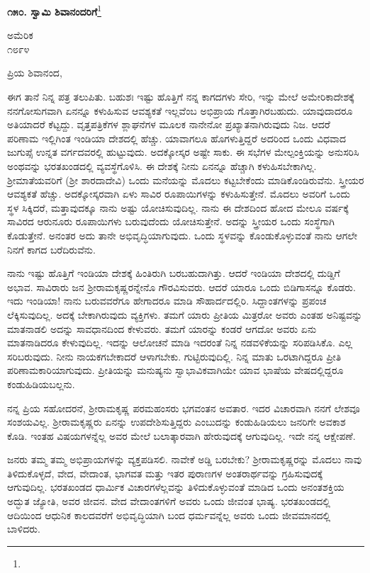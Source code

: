 \begin{center}
\textbf{೧೫೦. ಸ್ವಾಮಿ ಶಿವಾನಂದರಿಗೆ}\footnote{}
\end{center}

\begin{flushright}
ಅಮೆರಿಕ\\೧೮೯೪
\end{flushright}

\noindent
ಪ್ರಿಯ ಶಿವಾನಂದ,

ಈಗ ತಾನೆ ನಿನ್ನ ಪತ್ರ ತಲುಪಿತು. ಬಹುಶಃ ಇಷ್ಟು ಹೊತ್ತಿಗೆ ನನ್ನ ಕಾಗದಗಳು ಸೇರಿ, ಇನ್ನು ಮೇಲೆ ಅಮೇರಿಕಾದೇಶಕ್ಕೆ ನನಗೋಸುಗವಾಗಿ ಏನನ್ನೂ ಕಳುಹಿಸುವ ಆವಶ್ಯಕತೆ ಇಲ್ಲವೆಂಬ ಅಭಿಪ್ರಾಯ ಗೊತ್ತಾಗಿರಬಹುದು. ಯಾವುದಾದರೂ ಅತಿಯಾದರೆ ಕೆಟ್ಟದ್ದು. ವೃತ್ತಪತ್ರಿಕೆಗಳ ಶ್ಲಾಘನೆಗಳ ಮೂಲಕ ನಾನೇನೋ ಪ್ರಖ್ಯಾತನಾಗಿರುವುದು ನಿಜ. ಆದರೆ ಪರಿಣಾಮ ಇಲ್ಲಿಗಿಂತ ಇಂಡಿಯಾ ದೇಶದಲ್ಲಿ ಹೆಚ್ಚು. ಯಾವಾಗಲೂ ಹೊಗಳುತ್ತಿದ್ದರೆ ಅದರಿಂದ ಒಂದು ವಿಧವಾದ ಜುಗುಪ್ಸೆ ಉನ್ನತ ವರ್ಗದವರಲ್ಲಿ ಹುಟ್ಟುವುದು. ಅದಕ್ಕೋಸ್ಕರ ಅಷ್ಟೇ ಸಾಕು. ಈ ಸಭೆಗಳ ಮೇಲ್ಪಂಕ್ತಿಯನ್ನು ಅನುಸರಿಸಿ ಅಂಥವನ್ನು ಭರತಖಂಡದಲ್ಲಿ ವ್ಯವಸ್ಥೆಗೊಳಿಸಿ. ಈ ದೇಶಕ್ಕೆ ನೀನು ಏನನ್ನೂ ಹೆಚ್ಚಾಗಿ ಕಳುಹಿಸಬೇಕಾಗಿಲ್ಲ. ಶ‍್ರೀಮಾತೆಯವರಿಗೆ (ಶ‍್ರೀ ಶಾರದಾದೇವಿ) ಒಂದು ಮನೆಯನ್ನು ಮೊದಲು ಕಟ್ಟಬೇಕೆಂದು ಮಾಡಿಕೊಂಡಿರುವೆನು. ಸ್ತ್ರೀಯರ ಆವಶ್ಯಕತೆ ಹೆಚ್ಚು. ಅದಕ್ಕೋಸ್ಕರವಾಗಿ ಏಳು ಸಾವಿರ ರೂಪಾಯಿಗಳನ್ನು ಕಳುಹಿಸುತ್ತೇನೆ. ಮೊದಲು ಅವರಿಗೆ ಒಂದು ಸ್ಥಳ ಸಿಕ್ಕಿದರೆ, ಮತ್ತಾವುದಕ್ಕೂ ನಾನು ಅಷ್ಟು ಯೋಚಿಸುವುದಿಲ್ಲ. ನಾನು ಈ ದೇಶದಿಂದ ಹೋದ ಮೇಲೂ ವರ್ಷಕ್ಕೆ ಸಾವಿರದ ಆರುನೂರು ರೂಪಾಯಿಗಳು ಬರುವುದೆಂದು ಯೋಚಿಸುತ್ತೇನೆ. ಅದನ್ನು ಸ್ತ್ರೀಯರ ಒಂದು ಸಂಸ್ಥೆಗಾಗಿ ಕೊಡುತ್ತೇನೆ. ಅನಂತರ ಅದು ತಾನೇ ಅಭಿವೃದ್ಧಿಯಾಗುವುದು. ಒಂದು ಸ್ಥಳವನ್ನು ಕೊಂಡುಕೊಳ್ಳುವಂತೆ ನಾನು ಆಗಲೇ ನಿನಗೆ ಕಾಗದ ಬರೆದಿರುವೆನು.

ನಾನು ಇಷ್ಟು ಹೊತ್ತಿಗೆ ಇಂಡಿಯಾ ದೇಶಕ್ಕೆ ಹಿಂತಿರುಗಿ ಬರಬಹುದಾಗಿತ್ತು. ಆದರೆ ಇಂಡಿಯಾ ದೇಶದಲ್ಲಿ ದುಡ್ಡಿಗೆ ಅಭಾವ. ಸಾವಿರಾರು ಜನ ಶ‍್ರೀರಾಮಕೃಷ್ಣರನ್ನೇನೊ ಗೌರವಿಸುವರು. ಆದರೆ ಯಾರೂ ಒಂದು ಬಿಡಿಗಾಸನ್ನೂ ಕೊಡರು. ಇದು ಇಂಡಿಯಾ! ನಾನು ಬರುವವರೆಗೂ ಹೇಗಾದರೂ ಮಾಡಿ ಸೌಹಾರ್ದದಲ್ಲಿರಿ. ಸಿದ್ದಾಂತಗಳನ್ನು ಪ್ರಪಂಚ ಲೆಕ್ಕಿಸುವುದಿಲ್ಲ. ಅದಕ್ಕೆ ಬೇಕಾಗಿರುವುದು ವ್ಯಕ್ತಿಗಳು. ತಮಗೆ ಯಾರು ಪ್ರೀತಿಯ ಮಿತ್ರರೋ ಅವರು ಎಂತಹ ಅನಿಷ್ಟವನ್ನು ಮಾತನಾಡಲಿ ಅದನ್ನು ಸಾವಧಾನದಿಂದ ಕೇಳುವರು. ತಮಗೆ ಯಾರನ್ನು ಕಂಡರೆ ಆಗದೋ ಅವರು ಏನು ಮಾತನಾಡಿದರೂ ಕೇಳುವುದಿಲ್ಲ. ಇದನ್ನು ಆಲೋಚನೆ ಮಾಡಿ ಇದರಂತೆ ನಿನ್ನ ನಡವಳಿಕೆಯನ್ನು ಸರಿಪಡಿಸಿಕೊ. ಎಲ್ಲ ಸರಿಬರುವುದು. ನೀನು ನಾಯಕಗಬೇಕಾದರೆ ಆಳಾಗಬೇಕು. ಗುಟ್ಟಿರುವುದಿಲ್ಲಿ. ನಿನ್ನ ಮಾತು ಒರಟಾಗಿದ್ದರೂ ಪ್ರೀತಿ ಪರಿಣಾಮಕಾರಿಯಾಗುವುದು. ಪ್ರೀತಿಯನ್ನು ಮನುಷ್ಯನು ಸ್ವಾಭಾವಿಕವಾಗಿಯೇ ಯಾವ ಭಾಷೆಯ ವೇಷದಲ್ಲಿದ್ದರೂ ಕಂಡುಹಿಡಿಯಬಲ್ಲನು.

ನನ್ನ ಪ್ರಿಯ ಸಹೋದರನೆ, ಶ‍್ರೀರಾಮಕೃಷ್ಣ ಪರಮಹಂಸರು ಭಗವಂತನ ಅವತಾರ. ಇದರ ವಿಚಾರವಾಗಿ ನನಗೆ ಲೇಶವೂ ಸಂಶಯವಿಲ್ಲ. ಶ‍್ರೀರಾಮಕೃಷ್ಣರು ಏನನ್ನು ಉಪದೇಶಿಸುತ್ತಿದ್ದರು ಎಂಬುದನ್ನು ಕಂಡುಹಿಡಿಯಲು ಜನರಿಗೇ ಅವಕಾಶ ಕೊಡಿ. ಇಂತಹ ವಿಷಯಗಳನ್ನೆಲ್ಲ ಅವರ ಮೇಲೆ ಬಲಾತ್ಕಾರವಾಗಿ ಹೇರುವುದಕ್ಕೆ ಆಗುವುದಿಲ್ಲ. ಇದೇ ನನ್ನ ಆಕ್ಷೇಪಣೆ.

ಜನರು ತಮ್ಮ ತಮ್ಮ ಅಭಿಪ್ರಾಯಗಳನ್ನು ವ್ಯಕ್ತಪಡಿಸಲಿ. ನಾವೇಕೆ ಅಡ್ಡಿ ಬರಬೇಕು? ಶ‍್ರೀರಾಮಕೃಷ್ಣರನ್ನು ಮೊದಲು ನಾವು ತಿಳಿದುಕೊಳ್ಳದೆ, ವೇದ, ವೇದಾಂತ, ಭಾಗವತ ಮತ್ತು ಇತರ ಪುರಾಣಗಳ ಅಂತರಾರ್ಥವನ್ನು ಗ್ರಹಿಸುವುದಕ್ಕೆ ಆಗುವುದಿಲ್ಲ. ಭರತಖಂಡದ ಧಾರ್ಮಿಕ ವಿಚಾರಗಳೆಲ್ಲವನ್ನು ತಿಳಿದುಕೊಳ್ಳುವಂತೆ ಮಾಡಿದ ಒಂದು ಅನಂತಶಕ್ತಿಯ ಅದ್ಭುತ ಜ್ಯೋತಿ, ಅವರ ಜೀವನ. ವೇದ ವೇದಾಂತಗಳಿಗೆ ಅವರು ಒಂದು ಜೀವಂತ ಭಾಷ್ಯ. ಭರತಖಂಡದಲ್ಲಿ ಆದಿಯಿಂದ ಆಧುನಿಕ ಕಾಲದವರೆಗೆ ಅಭಿವೃದ್ಧಿಯಾಗಿ ಬಂದ ಧರ್ಮವನ್ನೆಲ್ಲ ಅವರು ಒಂದು ಜೀವಮಾನದಲ್ಲಿ ಬಾಳಿದರು.

